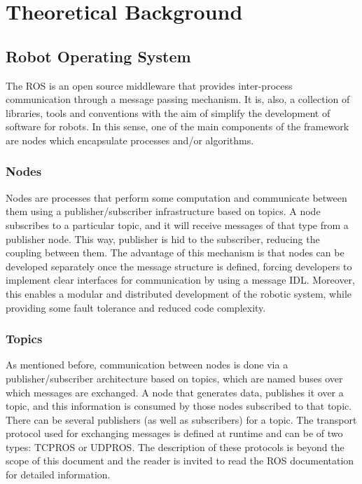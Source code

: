 \chapter{Theoretical Background}
\label{chapter1}

\section{Robot Operating System}
\label{chapter1:ros}
The \ac{ROS} \nocite{ros-website} is an open source middleware that provides inter-process communication through a message passing mechanism. It is, also, a collection of libraries, tools and conventions with the aim of simplify the development of software for robots. In this sense, one of the main components of the framework are nodes which encapsulate processes and/or algorithms.

\subsection{Nodes}
\label{chapter1:ros:nodes}
Nodes are processes that perform some computation and communicate between them using a publisher/subscriber infrastructure based on topics. A node subscribes to a particular topic, and it will receive messages of that type from a publisher node. This way, publisher is hid to the subscriber, reducing the coupling between them. The advantage of this mechanism is that nodes can be developed separately once the message structure is defined, forcing developers to implement clear interfaces for communication by using a message \ac{IDL}. Moreover, this enables a modular and distributed development of the robotic system, while providing some fault tolerance and reduced code complexity.

\subsection{Topics}
\label{chapter1:ros:topics}
As mentioned before, communication between nodes is done via a publisher/subscriber architecture based on topics, which are named buses over which messages are exchanged. A node that generates data, publishes it over a topic, and this information is consumed by those nodes subscribed to that topic. There can be several publishers (as well as subscribers) for a topic. The transport protocol used for exchanging messages is defined at runtime and can be of two types: TCPROS or UDPROS. The description of these protocols is beyond the scope of this document and the reader is invited to read the ROS documentation for detailed information.

